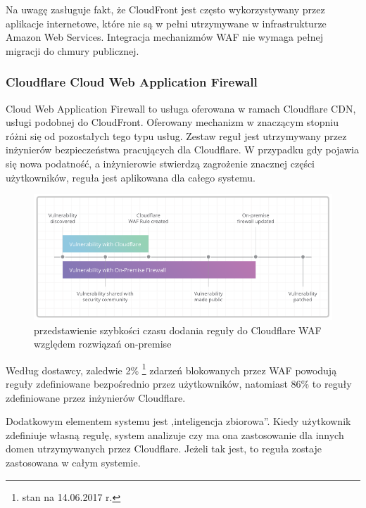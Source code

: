 \documentclass[11pt,a4paper,polish,thesis,oneside]{dcsbook}
\begin{document}
Na uwagę zasługuje fakt, że CloudFront jest często wykorzystywany przez aplikacje internetowe, które nie są w pełni utrzymywane w infrastrukturze Amazon Web Services. Integracja mechanizmów WAF nie wymaga pełnej migracji do chmury publicznej.


\subsubsection{Cloudflare Cloud Web Application Firewall}
Cloud Web Application Firewall to usługa oferowana w ramach Cloudflare CDN, usługi podobnej do CloudFront. Oferowany mechanizm w znaczącym stopniu różni się od pozostałych tego typu usług. Zestaw reguł jest utrzymywany przez inżynierów bezpieczeństwa pracujących dla Cloudflare. W przypadku gdy pojawia się nowa podatność, a inżynierowie stwierdzą zagrożenie znacznej części użytkowników, reguła jest aplikowana dla całego systemu.

\begin{figure}[h]
\centering
\includegraphics[scale=0.7]{cloudflare}

\caption{przedstawienie szybkości czasu dodania reguły do Cloudflare WAF względem rozwiązań on-premise \cite{cloudflarewaf}}
\label{fig:cloudflare}
\end{figure}

Według dostawcy, zaledwie 2\% \footnote{stan na 14.06.2017 r.} zdarzeń blokowanych przez WAF powodują reguły zdefiniowane bezpośrednio przez użytkowników, natomiast 86\% to reguły zdefiniowane przez inżynierów Cloudflare.

Dodatkowym elementem systemu jest ,inteligencja zbiorowa''. Kiedy użytkownik zdefiniuje własną regułę, system analizuje czy ma ona zastosowanie dla innych domen utrzymywanych przez Cloudflare. Jeżeli tak jest, to reguła zostaje zastosowana w całym systemie.


\end{document}
